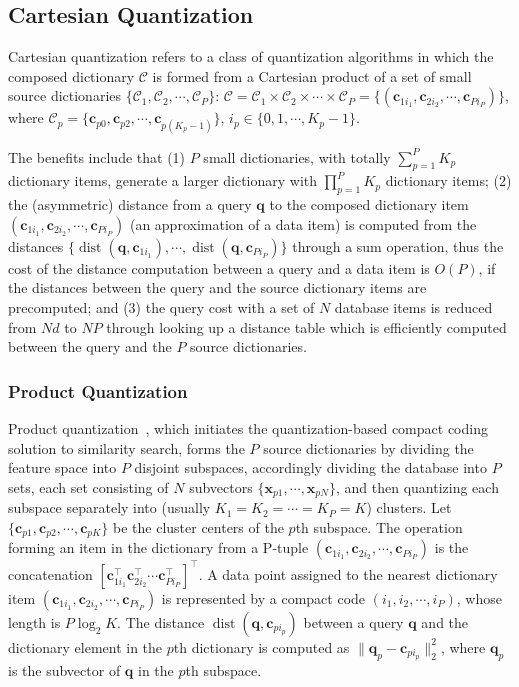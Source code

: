 \documentclass[10pt,journal,compsoc]{IEEEtran}
\begin{document}
\subsection{Cartesian Quantization}
\label{sec:LTH2:CAQ}
Cartesian quantization refers to
a class of quantization algorithms
in which
the composed dictionary $\mathcal{C}$
is formed from a Cartesian product
of a set of small source dictionaries
$\{\mathcal{C}_1, \mathcal{C}_2, \cdots, \mathcal{C}_P\}$:
$\mathcal{C} = \mathcal{C}_1 \times \mathcal{C}_2 \times \cdots \times \mathcal{C}_P
= \{(\mathbf{c}_{1i_1}, \mathbf{c}_{2i_2}, \cdots, \mathbf{c}_{Pi_P})\}$,
where $\mathcal{C}_p = \{\mathbf{c}_{p0}, \mathbf{c}_{p2}, \cdots, \mathbf{c}_{p(K_p-1)}\}$,
$i_p \in \{0, 1, \cdots, K_p -1\}$.

The benefits include that (1) $P$ small dictionaries,
with totally $\sum_{p=1}^PK_p$ dictionary items,
generate a larger dictionary
with $\prod_{p=1}^PK_p$ dictionary items;
(2) the (asymmetric) distance from a query $\mathbf{q}$
to the composed dictionary item
$(\mathbf{c}_{1i_1}, \mathbf{c}_{2i_2}, \cdots, \mathbf{c}_{Pi_P})$
(an approximation of a data item)
is computed from the distances
$\{\operatorname{dist}(\mathbf{q}, \mathbf{c}_{1i_1}), \cdots,
\operatorname{dist}(\mathbf{q}, \mathbf{c}_{Pi_P})\}$
through a sum operation,
thus the cost of the distance computation
between a query and a data item
is $O(P)$,
if the distances between the query and the source dictionary items
are precomputed;
and
(3) the query cost with a set of $N$ database items
is reduced from
$Nd$ to $NP$
through looking up a distance table
which is efficiently computed
between the query and the $P$ source dictionaries.

\subsubsection{Product Quantization}
Product quantization~\cite{JegouDS11},
which initiates the quantization-based compact coding solution to similarity search,
forms the $P$ source dictionaries
by dividing the feature space
into $P$ disjoint subspaces,
accordingly dividing the database into $P$ sets,
each set consisting of $N$ subvectors
$\{\mathbf{x}_{p1}, \cdots, \mathbf{x}_{pN}\}$,
and then quantizing each subspace separately
into (usually $K_1 = K_2 = \cdots = K_P = K$) clusters.
Let $\{\mathbf{c}_{p1}, \mathbf{c}_{p2},
\cdots, \mathbf{c}_{pK}\}$ be the cluster centers
of the $p$th subspace.
The operation forming an item in the dictionary
from a P-tuple $(\mathbf{c}_{1i_1}, \mathbf{c}_{2i_2}, \cdots, \mathbf{c}_{Pi_P})$
is the concatenation $[\mathbf{c}_{1i_1}^\top \mathbf{c}_{2i_2}^\top \cdots\mathbf{c}_{Pi_P}^\top]^\top$.
A data point assigned to
the nearest dictionary item $(\mathbf{c}_{1i_1}, \mathbf{c}_{2i_2}, \cdots, \mathbf{c}_{Pi_P})$
is represented
by a compact code $(i_1,i_2, \cdots, i_P)$,
whose length is $P\log_2 K$.
The distance $\operatorname{dist}(\mathbf{q}, \mathbf{c}_{pi_p})$
between a query $\mathbf{q}$ and the dictionary element in the $p$th dictionary
is computed as $\|\mathbf{q}_p - \mathbf{c}_{pi_p}\|_2^2$,
where $\mathbf{q}_p$ is the subvector of $\mathbf{q}$
in the $p$th subspace.
\end{document}
